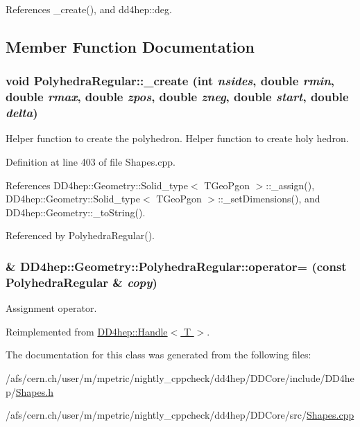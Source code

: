 References \_\-create(), and dd4hep::deg.

\subsection{Member Function Documentation}
\hypertarget{class_d_d4hep_1_1_geometry_1_1_polyhedra_regular_add1de904bca13df6b2b5e938e1afb7d8}{
\subsubsection[{\_\-create}]{\setlength{\rightskip}{0pt plus 5cm}void PolyhedraRegular::\_\-create (int {\em nsides}, \/  double {\em rmin}, \/  double {\em rmax}, \/  double {\em zpos}, \/  double {\em zneg}, \/  double {\em start}, \/  double {\em delta})}}
\label{class_d_d4hep_1_1_geometry_1_1_polyhedra_regular_add1de904bca13df6b2b5e938e1afb7d8}


Helper function to create the polyhedron. Helper function to create holy hedron. 

Definition at line 403 of file Shapes.cpp.

References DD4hep::Geometry::Solid\_\-type$<$ TGeoPgon $>$::\_\-assign(), DD4hep::Geometry::Solid\_\-type$<$ TGeoPgon $>$::\_\-setDimensions(), and DD4hep::Geometry::\_\-toString().

Referenced by PolyhedraRegular().\hypertarget{class_d_d4hep_1_1_geometry_1_1_polyhedra_regular_ab38a979b481a85b991b407cf30606b60}{
\subsubsection[{operator=}]{\& DD4hep::Geometry::PolyhedraRegular::operator= (const {\bf PolyhedraRegular} \& {\em copy})}}
\label{class_d_d4hep_1_1_geometry_1_1_polyhedra_regular_ab38a979b481a85b991b407cf30606b60}


Assignment operator. 

Reimplemented from \hyperlink{class_d_d4hep_1_1_handle_a9bbf8f498df42e81ad26fb00233505a6}{DD4hep::Handle$<$ T $>$}.

The documentation for this class was generated from the following files:\begin{DoxyCompactItemize}
\item 
/afs/cern.ch/user/m/mpetric/nightly\_\-cppcheck/dd4hep/DDCore/include/DD4hep/\hyperlink{_shapes_8h}{Shapes.h}\item 
/afs/cern.ch/user/m/mpetric/nightly\_\-cppcheck/dd4hep/DDCore/src/\hyperlink{_shapes_8cpp}{Shapes.cpp}\end{DoxyCompactItemize}
